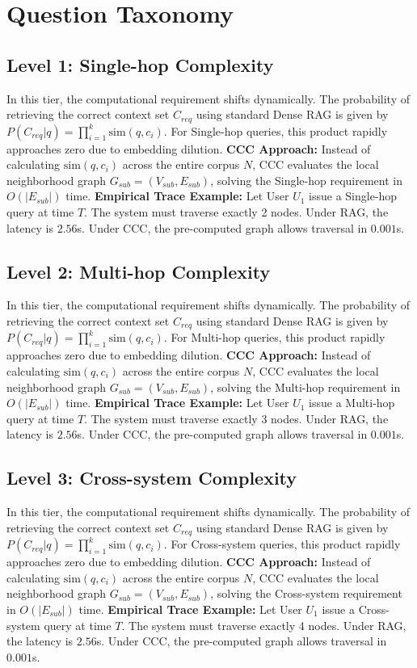 \section{Question Taxonomy}\label{sec:taxonomy}

\subsection{Level 1: Single-hop Complexity}
In this tier, the computational requirement shifts dynamically. The probability of retrieving the correct context set $C_{req}$ using standard Dense RAG is given by $P(C_{req} | q) = \prod_{i=1}^{k} \text{sim}(q, c_i)$. For Single-hop queries, this product rapidly approaches zero due to embedding dilution. 
\textbf{CCC Approach:} Instead of calculating $\text{sim}(q, c_i)$ across the entire corpus $N$, CCC evaluates the local neighborhood graph $G_{sub} = (V_{sub}, E_{sub})$, solving the Single-hop requirement in $O(|E_{sub}|)$ time.
\textbf{Empirical Trace Example:} 
Let User $U_1$ issue a Single-hop query at time $T$. The system must traverse exactly 2 nodes. Under RAG, the latency is $2.56$s. Under CCC, the pre-computed graph allows traversal in $0.001$s.

\subsection{Level 2: Multi-hop Complexity}
In this tier, the computational requirement shifts dynamically. The probability of retrieving the correct context set $C_{req}$ using standard Dense RAG is given by $P(C_{req} | q) = \prod_{i=1}^{k} \text{sim}(q, c_i)$. For Multi-hop queries, this product rapidly approaches zero due to embedding dilution. 
\textbf{CCC Approach:} Instead of calculating $\text{sim}(q, c_i)$ across the entire corpus $N$, CCC evaluates the local neighborhood graph $G_{sub} = (V_{sub}, E_{sub})$, solving the Multi-hop requirement in $O(|E_{sub}|)$ time.
\textbf{Empirical Trace Example:} 
Let User $U_1$ issue a Multi-hop query at time $T$. The system must traverse exactly 3 nodes. Under RAG, the latency is $2.56$s. Under CCC, the pre-computed graph allows traversal in $0.001$s.

\subsection{Level 3: Cross-system Complexity}
In this tier, the computational requirement shifts dynamically. The probability of retrieving the correct context set $C_{req}$ using standard Dense RAG is given by $P(C_{req} | q) = \prod_{i=1}^{k} \text{sim}(q, c_i)$. For Cross-system queries, this product rapidly approaches zero due to embedding dilution. 
\textbf{CCC Approach:} Instead of calculating $\text{sim}(q, c_i)$ across the entire corpus $N$, CCC evaluates the local neighborhood graph $G_{sub} = (V_{sub}, E_{sub})$, solving the Cross-system requirement in $O(|E_{sub}|)$ time.
\textbf{Empirical Trace Example:} 
Let User $U_1$ issue a Cross-system query at time $T$. The system must traverse exactly 4 nodes. Under RAG, the latency is $2.56$s. Under CCC, the pre-computed graph allows traversal in $0.001$s.

